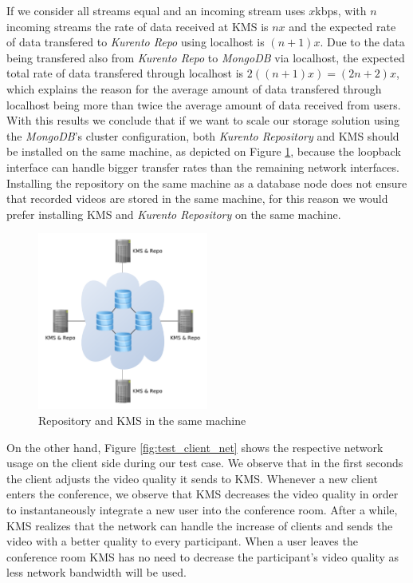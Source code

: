 If we consider all streams equal and an incoming stream uses $x$kbps, with $n$ incoming streams the rate of data received at \ac{KMS} is $nx$ and the expected rate of data transfered to \emph{Kurento Repo} using localhost is $(n+1)x$. Due to the data being transfered also from \emph{Kurento Repo} to \emph{MongoDB} via localhost, the expected total rate of data transfered through localhost is $2((n+1)x) = (2n+2)x$, which explains the reason for the average amount of data transfered through localhost being more than twice the average amount of data received from users. With this results we conclude that if we want to scale our storage solution using the \emph{MongoDB}'s cluster configuration, both \emph{Kurento Repository} and \ac{KMS} should be installed on the same machine, as depicted on Figure \ref{fig:scale2}, because the loopback interface can handle bigger transfer rates than the remaining network interfaces. Installing the repository on the same machine as a database node does not ensure that recorded videos are stored in the same machine, for this reason we would prefer installing \ac{KMS} and \emph{Kurento Repository} on the same machine.

\begin{figure}
  \centering
  \includegraphics[width=0.5\textwidth]{figures/scale2.pdf}
  \caption{Repository and KMS in the same machine}
  \label{fig:scale2}
\end{figure}



On the other hand, Figure \ref{fig:test_client_net} shows the respective network usage on the client side during our test case. We observe that in the first seconds the client adjusts the video quality it sends to \ac{KMS}. Whenever a new client enters the conference, we observe that \ac{KMS} decreases the video quality in order to instantaneously integrate a new user into the conference room. After a while, \ac{KMS} realizes that the network can handle the increase of clients and sends the video with a better quality to every participant. When a user leaves the conference room \ac{KMS} has no need to decrease the participant's video quality as less network bandwidth will be used.

